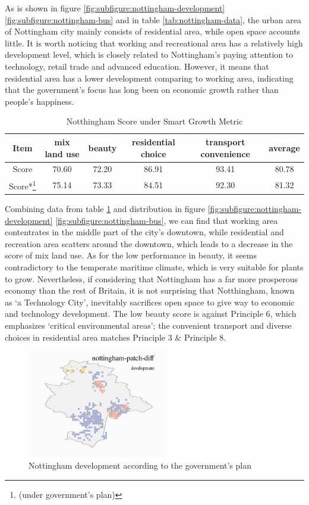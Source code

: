 As is shown in figure \ref{fig:subfigure:nottingham-development} \ref{fig:subfigure:nottingham-bus} and in table \ref{tab:nottingham-data}, the urban area of Nottingham city mainly consists of residential area, while open space accounts little.
It is worth noticing that working and recreational area has a relatively high development level, which is closely related to Nottingham's paying attention to technology, retail trade and advanced education.
However, it means that residential area has a lower development comparing to working area, indicating that the government's focus has long been on economic growth rather than people's happiness.
\\
\begin{table}
  \begin{tabular}{c|cccc|c}
    \hline
    Item & mix land use & beauty & residential choice & transport convenience & average \\
    \hline
    Score & 70.60 & 72.20 & 86.91 & 93.41 & 80.78 \\
    Score*\footnote{(under government's plan)} & 75.14 & 73.33 & 84.51 & 92.30 & 81.32 \\
    \hline
  \end{tabular}
  \caption{Notthingham Score under Smart Growth Metric}
  \label{tab:nottingham-score}
\end{table}
Combining data from table \ref{tab:nottingham-score} and distribution in figure \ref{fig:subfigure:nottingham-development} \ref{fig:subfigure:nottingham-bus}, we can find that working area contentrates in the middle part of the city's downtown, while residential and recreation area scatters around the downtown, which leads to a decrease in the score of mix land use.
As for the low performance in beauty, it seems contradictory to the temperate maritime climate, which is very suitable for plants to grow.
Nevertheless, if considering that Nottingham has a far more prosperous economy than the rest of Britain, it is not surprising that Notthingham, known as `a Technology City', inevitably sacrifices open space to give way to economic and technology development.
The low beauty score is against Principle 6, which emphasizes `critical environmental areas';
the convenient transport and diverse choices in residential area matches Principle 3 \& Principle 8.
\\
\begin{figure}[htb]
  \label{fig:nottingham-patch-diff}
  \centering
  \includegraphics[width=6cm]{pic/nottingham-patch-diff-development.png}
  \caption{Nottingham development according to the government's plan}
\end{figure}
